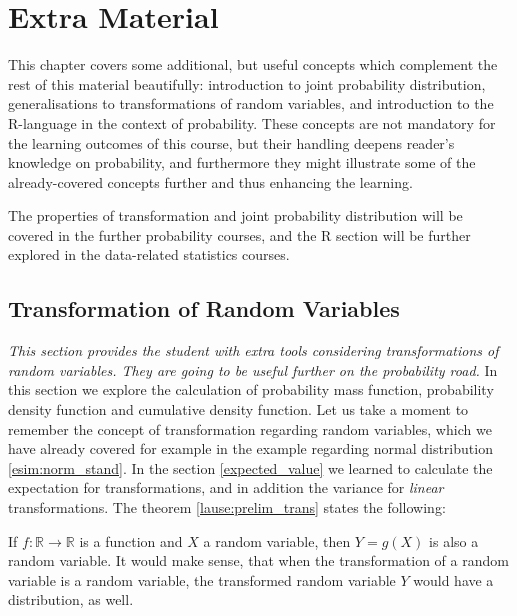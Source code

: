 \documentclass[12pt,a4paper,leqno]{report}
\theoremstyle{plain}
\theoremstyle{definition}
\begin{document}

 \chapter{Extra Material}\label{extra}
 
This chapter covers some additional, but useful concepts which complement the rest of this material beautifully: introduction to joint probability distribution, generalisations to transformations of random variables, and introduction to the R-language in the context of probability. These concepts are not mandatory for the learning outcomes of this course, but their handling deepens reader's knowledge on probability, and furthermore they might illustrate some of the already-covered concepts further and thus enhancing the learning.

The properties of transformation and joint probability distribution will be covered in the further probability courses, and the R section will be further explored in the data-related statistics courses.

\section{Transformation of Random Variables} \label{rv_trans}

\emph{This section provides the student with extra tools considering transformations of random variables. They are going to be useful further on the probability road.}
In this section we explore the calculation of probability mass function, probability density function and cumulative density function. Let us take a moment to remember the concept of transformation regarding random variables, which we have already covered for example in the example regarding normal distribution \ref{esim:norm_stand}. In the section \ref{expected_value} we learned to calculate the expectation for transformations, and in addition the variance for \emph{linear} transformations. The theorem \ref{lause:prelim_trans} states the following:

If $f :\mathbb{R} \rightarrow \mathbb{R}$ is a function and $X$ a random variable, then $Y =g(X)$ is also a random variable. It would make sense, that when the transformation of a random variable is a random variable, the transformed random variable $Y$ would have a distribution, as well.
\end{document}
